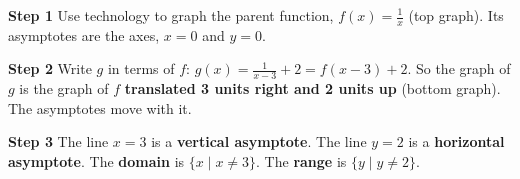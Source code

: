 \begin{minipage}[t]{0.56\textwidth}
\vspace{0pt}\raggedright
\textbf{Step 1} Use technology to graph the parent function, $f(x)=\frac{1}{x}$ (top graph). Its asymptotes are the axes, $x=0$ and $y=0$.

\textbf{Step 2} Write $g$ in terms of $f$: $g(x)=\frac{1}{x-3}+2=f(x-3)+2$. So the graph of $g$ is the graph of $f$ \textbf{translated 3 units right and 2 units up} (bottom graph). The asymptotes move with it.

\textbf{Step 3} The line $x=3$ is a \textbf{vertical asymptote}. The line $y=2$ is a \textbf{horizontal asymptote}. The \textbf{domain} is $\{x\mid x\neq3\}$. The \textbf{range} is $\{y\mid y\neq2\}$.

\vspace{2pt}
{\small{}}
\end{minipage}\hfill

